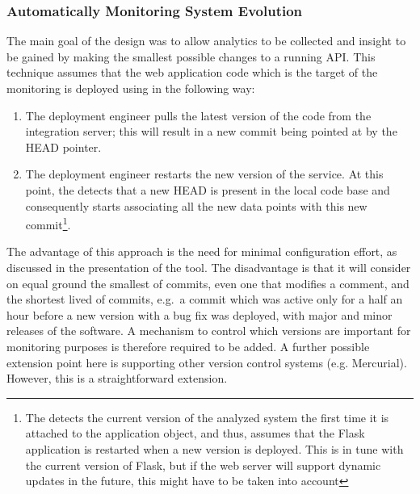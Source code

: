 \documentclass{sig-alternate-05-2015}
\begin{document}

  \subsubsection{Automatically Monitoring System Evolution}

  The main goal of the \tool design was to allow analytics to be collected and insight to be gained by making the smallest possible changes to a running API. %
%
  This technique assumes that the web application code which is the target of the monitoring is deployed using \git in the following way: 

  \begin{enumerate}
    \item The deployment engineer pulls the latest version of the code from the integration server; this will result in a new commit being pointed at by the HEAD pointer. %
    \item The deployment engineer restarts the new version of the service. At this point, the \tool detects that a new HEAD is present in the local code base and consequently starts associating all the new data points with this new commit\footnote{The \tool detects the current version of the analyzed system the first time it is attached to the application object, and thus, assumes that the Flask application is restarted when a new version is deployed. This is in tune with the current version of Flask, but if the web server will support dynamic updates in the future, this might have to be taken into account}.
  \end{enumerate}

  The advantage of this approach is the need for minimal configuration effort, as discussed in the presentation of the tool. The disadvantage is that it will consider on equal ground the smallest of commits, even one that modifies a comment, and the shortest lived of commits, e.g.~a commit which was active only for a half an hour before a new version with a bug fix was deployed, with major and minor releases of the software. %
  A mechanism to control which versions are important for monitoring purposes is therefore required to be added.
%
  A further possible extension point here is supporting other version control systems (e.g. Mercurial). However, this is a straightforward extension.
\end{document}
